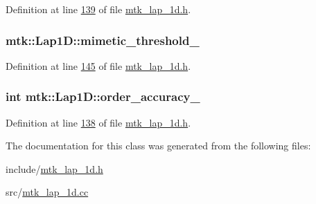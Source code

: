 Definition at line \hyperlink{mtk__lap__1d_8h_source_l00139}{139} of file \hyperlink{mtk__lap__1d_8h_source}{mtk\+\_\+lap\+\_\+1d.\+h}.

\hypertarget{classmtk_1_1Lap1D_a20dce13067774c64dff892323d9c586e}{
\subsubsection[{mimetic\+\_\+threshold\+\_\+}]{ mtk\+::\+Lap1\+D\+::mimetic\+\_\+threshold\+\_\+\hspace{0.3cm}{\ttfamily [private]}}}\label{classmtk_1_1Lap1D_a20dce13067774c64dff892323d9c586e}


Definition at line \hyperlink{mtk__lap__1d_8h_source_l00145}{145} of file \hyperlink{mtk__lap__1d_8h_source}{mtk\+\_\+lap\+\_\+1d.\+h}.

\hypertarget{classmtk_1_1Lap1D_a35d34c085b9cf6f9961a699dfb02fea6}{
\subsubsection[{order\+\_\+accuracy\+\_\+}]{\setlength{\rightskip}{0pt plus 5cm}int mtk\+::\+Lap1\+D\+::order\+\_\+accuracy\+\_\+\hspace{0.3cm}{\ttfamily [private]}}}\label{classmtk_1_1Lap1D_a35d34c085b9cf6f9961a699dfb02fea6}


Definition at line \hyperlink{mtk__lap__1d_8h_source_l00138}{138} of file \hyperlink{mtk__lap__1d_8h_source}{mtk\+\_\+lap\+\_\+1d.\+h}.



The documentation for this class was generated from the following files\+:\begin{DoxyCompactItemize}
\item 
include/\hyperlink{mtk__lap__1d_8h}{mtk\+\_\+lap\+\_\+1d.\+h}\item 
src/\hyperlink{mtk__lap__1d_8cc}{mtk\+\_\+lap\+\_\+1d.\+cc}\end{DoxyCompactItemize}
